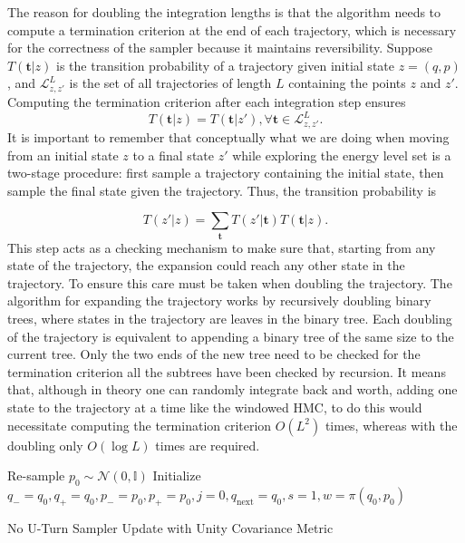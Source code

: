 \documentclass[12pt]{report}
\begin{document}
The reason for doubling the integration lengths is that the algorithm needs to compute a termination criterion at the end of each trajectory, which is necessary for the correctness of the sampler because it maintains reversibility. Suppose $T(\mathbf{t}|z) $ is the transition probability of a trajectory given initial state $z=(q,p)$, and $\mathcal{L}^L_{z,z'}$ is the set of all trajectories of length $L$ containing the points $z$ and $z'$. Computing the termination criterion after each integration step ensures
\[T(\mathbf{t}|z) = T(\mathbf{t}|z') , \forall \mathbf{t} \in \mathcal{L}^L_{z,z'} . \]
It is important to remember that conceptually what we are doing when moving from an initial state $z$ to a final state $z'$ while exploring the energy level set is a two-stage procedure: first sample a trajectory containing the initial state, then sample the final state given the trajectory.  Thus, the transition probability is 

\[T(z'|z) = \sum_{\mathbf{t}} T(z'|\mathbf{t}) T(\mathbf{t}|z). \]
This step acts as a checking mechanism to make sure that, starting from any state of the trajectory, the expansion could reach any other state in the trajectory. To ensure this care must be taken when doubling the trajectory. The algorithm for expanding the trajectory works by recursively doubling binary trees, where states in the trajectory are leaves in the binary tree. Each doubling of the trajectory is equivalent to appending a binary tree of the same size to the current tree. Only the two ends of the new tree need to be checked for the termination criterion all the subtrees have been checked by recursion.
It means that, although in theory one can randomly integrate back and worth, adding one state to the trajectory at a time like the windowed HMC, to do this would necessitate  computing the termination criterion $O(L^2)$ times, whereas with the doubling only $O(\log L)$ times are required. 





\begin{algorithm}
    Re-sample $p_0 \sim \mathcal{N}(0,\mathbb{I})$ \;
    Initialize $q_{-} = q_0 , q_{+} = q_0 , p_{-} =p_0 , p_+ = p_0, j =0 ,	q_{\text{next}} = q_0 , s = 1 , w = \pi(q_0,p_0)$ \;

\caption{No U-Turn Sampler Update with Unity Covariance Metric}
\end{algorithm}
\end{document}
